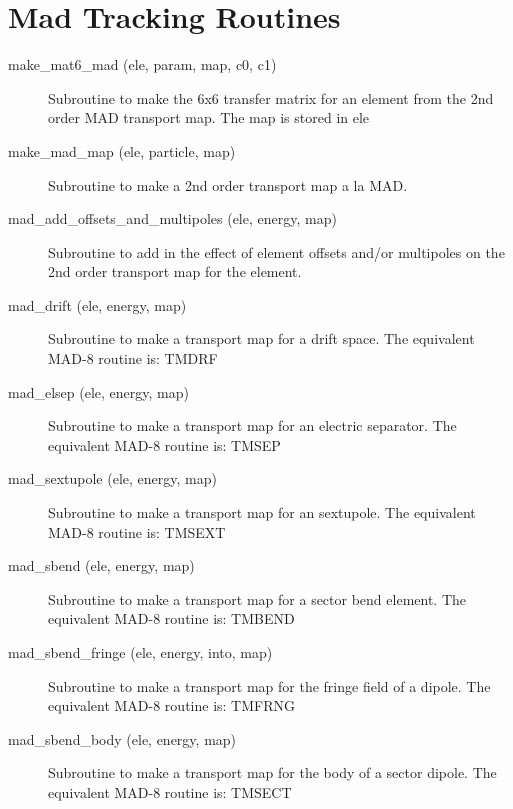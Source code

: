 \section{Mad Tracking Routines}
\label{r:mad}      

\begin{description}

\item[make\_mat6\_mad (ele, param, map, c0, c1)] \Newline 
     Subroutine to make the 6x6 transfer matrix for an element from the 
     2nd order MAD transport map. The map is stored in ele%

\item[make\_mad\_map (ele, particle, map)] \Newline 
     Subroutine to make a 2nd order transport map a la MAD.

\item[mad\_add\_offsets\_and\_multipoles (ele, energy, map)] \Newline 
     Subroutine to add in the effect of element offsets and/or multipoles
     on the 2nd order transport map for the element.

\item[mad\_drift (ele, energy, map)] \Newline 
     Subroutine to make a transport map for a drift space.
     The equivalent MAD-8 routine is: TMDRF

\item[mad\_elsep (ele, energy, map)] \Newline 
     Subroutine to make a transport map for an electric separator. 
     The equivalent MAD-8 routine is: TMSEP

\item[mad\_sextupole (ele, energy, map)] \Newline 
     Subroutine to make a transport map for an sextupole.
     The equivalent MAD-8 routine is: TMSEXT

\item[mad\_sbend (ele, energy, map)] \Newline 
     Subroutine to make a transport map for a sector bend element.
     The equivalent MAD-8 routine is: TMBEND

\item[mad\_sbend\_fringe (ele, energy, into, map)] \Newline 
     Subroutine to make a transport map for the fringe field of a dipole.
     The equivalent MAD-8 routine is: TMFRNG

\item[mad\_sbend\_body (ele, energy, map)] \Newline 
     Subroutine to make a transport map for the body of a sector dipole.
     The equivalent MAD-8 routine is: TMSECT


\end{description}

